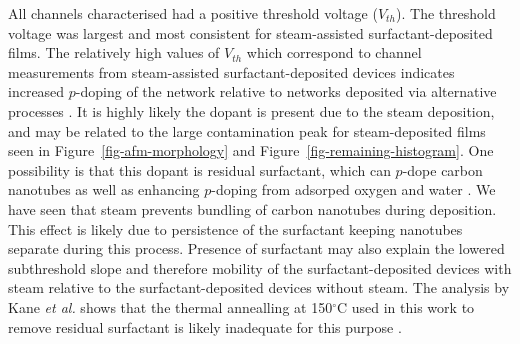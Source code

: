 \documentclass[
  a4paper,
]{scrbook}
\begin{document}
All channels characterised had a positive threshold voltage
(\(V_{th}\)). The threshold voltage was largest and most consistent for
steam-assisted surfactant-deposited films. The relatively high values of
\(V_{th}\) which correspond to channel measurements from steam-assisted
surfactant-deposited devices indicates increased \(p\)-doping of the
network relative to networks deposited via alternative processes
\autocite{Kang2005,Heller2008,Murugathas2018}. It is highly likely the
dopant is present due to the steam deposition, and may be related to the
large contamination peak for steam-deposited films seen in
Figure~\ref{fig-afm-morphology} and
Figure~\ref{fig-remaining-histogram}. One possibility is that this
dopant is residual surfactant, which can \(p\)-dope carbon nanotubes as
well as enhancing \(p\)-doping from adsorped oxygen and water
\autocite{Kane2014,Nonoguchi2018}. We have seen that steam prevents
bundling of carbon nanotubes during deposition. This effect is likely
due to persistence of the surfactant keeping nanotubes separate during
this process. Presence of surfactant may also explain the lowered
subthreshold slope and therefore mobility of the surfactant-deposited
devices with steam relative to the surfactant-deposited devices without
steam. The analysis by Kane \emph{et al.} shows that the thermal
annealling at 150\(^\circ\)C used in this work to remove residual
surfactant is likely inadequate for this purpose \autocite{Kane2014}.
\end{document}
